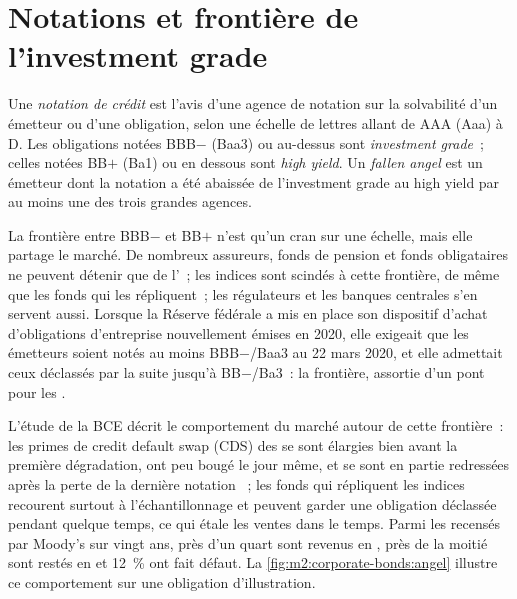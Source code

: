 \section{Notations et frontière de l'investment grade}

\begin{definition}\label{def:m2:corporate-bonds:rating}
Une \emph{notation de crédit} est l'avis d'une agence de notation sur
la solvabilité d'un émetteur ou d'une obligation, selon une échelle de lettres allant de AAA (Aaa) à D.
Les obligations notées BBB$-$ (Baa3) ou au-dessus sont \emph{investment grade}~;
celles notées BB$+$ (Ba1) ou en dessous sont \emph{high yield}. Un
\emph{fallen angel} est un émetteur dont la notation a été abaissée de l'investment
grade au high yield par au moins une des trois grandes agences.
\end{definition}

La frontière entre BBB$-$ et BB$+$ n'est qu'un cran sur une échelle, mais elle partage le
marché. De nombreux assureurs, fonds de pension et fonds obligataires ne peuvent détenir que de l'~; les indices sont scindés à cette frontière, de même que les fonds qui les répliquent~;
les régulateurs et les banques centrales s'en servent aussi. Lorsque la Réserve fédérale a mis en place
son dispositif d'achat d'obligations d'entreprise nouvellement émises en 2020, elle exigeait que les émetteurs soient
notés au moins BBB$-$/Baa3 au 22 mars 2020, et elle admettait ceux déclassés par la suite
jusqu'à BB$-$/Ba3~: la frontière, assortie d'un pont pour les .

L'étude de la BCE décrit le comportement du marché autour de cette frontière~: les primes de
credit default swap (CDS) des  se sont élargies bien avant la première dégradation, ont peu bougé
le jour même, et se sont en partie redressées après la perte de la dernière notation ~;
les fonds qui répliquent les indices recourent surtout à l'échantillonnage et peuvent garder une obligation déclassée pendant
quelque temps, ce qui étale les ventes dans le temps. Parmi les  recensés par Moody's sur vingt ans,
près d'un quart sont revenus en , près de la moitié
sont restés en  et 12~\% ont fait défaut. La \cref{fig:m2:corporate-bonds:angel}
illustre ce comportement sur une obligation d'illustration.


